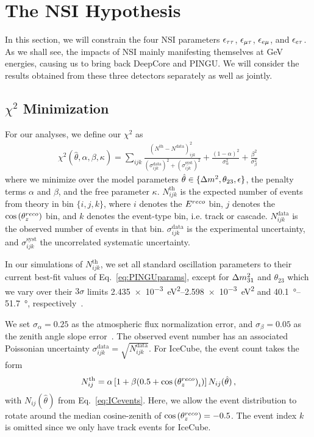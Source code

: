 \section{The NSI Hypothesis}\label{sec:constraining}
In this section, we will constrain the four NSI parameters $\epsilon_{\tau\tau}$, $\epsilon_{\mu\tau}$, $\epsilon_{e\mu}$, and $\epsilon_{e\tau}$. As we shall see, the impacts of NSI mainly manifesting 
themselves at \si{\GeV} energies, causing us to bring back DeepCore and PINGU. We will consider the results obtained from these three detectors separately as well as jointly.

\subsection{\texorpdfstring{$\chi^2$}{Chi-squared} Minimization}
\label{sec:nsi_chi2}
For our analyses, we define our $\chi^2$ as
\begin{align}\label{eq:chisq_NSI}
    \chi^{2}(\hat{\theta},\alpha,\beta, \kappa)=\sum_{ijk} \frac{\left(N^\text{th}-N^\text{data}\right)_{ijk}^{2}}
    {\left(\sigma^\text{data}_{ijk}\right)^{2} + \left(\sigma^\text{syst}_{ijk}\right)^{2}}+ 
    \frac{(1-\alpha)^2}{\sigma_\alpha^2} + \frac{\beta^2}{\sigma_\beta^2}\,
\end{align}
where we minimize over the model parameters $\hat{\theta} \in \{\dm, \theta_{23}, \epsilon\}$, the penalty terms $\alpha$ and $\beta$, and the free parameter $\kappa$.
$N_{ijk}^\text{th}$ is the expected number of events from theory in bin $\{i,j,k\}$, where $i$ denotes the $E^{reco}$ bin, $j$ denotes the $\cos{(\theta_z^{reco})}$ bin,
and $k$ denotes the event-type bin, i.e. track or cascade. 
$N_{ijk}^\text{data}$ is the observed number of events in that bin. $\sigma^\text{data}_{ijk}$ is the experimental uncertainty, and $\sigma^\text{syst}_{ijk}$ the uncorrelated systematic
uncertainty.

In our simulations of $N_{ijk}^\text{th}$, we set all standard oscillation parameters to their current best-fit values of Eq.~\ref{eq:PINGUparams}, 
except for $\dm[31]$ and $\theta_{23}$
which we vary over their $3\sigma$ limits \SIrange{2.435e-3}{2.598e-3}{\eV\squared} and \SIrange{40.1}{51.7}{\degree}, respectively~\cite{nufit}.

We set $\sigma_\alpha = 0.25$ as the atmospheric flux normalization error, and $\sigma_\beta = 0.05$ as the zenith angle slope error~\cite{hondapaper}. 
The observed event number has an associated Poissonian uncertainty $\sigma_{ijk}^\text{data} = \sqrt{N_{ijk}^\text{data}}$.
For IceCube, the event count takes the form
\begin{align}
    N^\text{th}_{ij} = \alpha\left[1+\beta (0.5 + \cos{(\theta_z^{reco})}_i )\right] N_{ij}(\hat{\theta})\,,
\end{align}
with $N_{ij}(\hat{\theta})$ from Eq.~\ref{eq:ICevents}. Here, we allow the event distribution to rotate around the median cosine-zenith of $\cos{(\theta_z^{reco})} = -0.5$. 
The event index $k$ is omitted since we only have track events for IceCube.


